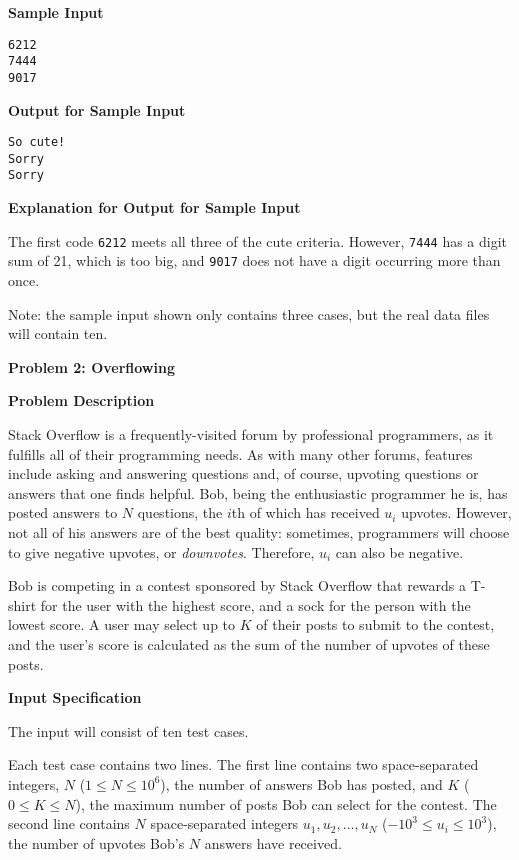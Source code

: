 \documentclass[11pt]{article}
\newcommand{\problem}[2]{\textbf{\Large Problem #1: #2} \vspace{0.4em}}
\newcommand{\heading}[1]{\vspace{0.6em} \textbf{#1}}
\begin{document}
\heading{Sample Input}
\vspace{-\topsep}
\begin{verbatim}
6212
7444
9017
\end{verbatim}

\heading{Output for Sample Input}
\vspace{-\topsep}
\begin{verbatim}
So cute!
Sorry
Sorry
\end{verbatim}

\heading{Explanation for Output for Sample Input}

The first code \verb|6212| meets all three of the cute criteria. However, \verb|7444| has a digit sum of 21, which is too big, and \verb|9017| does not have a digit occurring more than once.

Note: the sample input shown only contains three cases, but the real data files will contain ten.


\pagebreak




\problem{2}{Overflowing}


\heading{Problem Description}

Stack Overflow is a frequently-visited forum by professional programmers, as it fulfills all of their programming needs. As with many other forums, features include asking and answering questions and, of course, upvoting questions or answers that one finds helpful. Bob, being the enthusiastic programmer he is, has posted answers to $N$ questions, the $i$th of which has received $u_i$ upvotes. However, not all of his answers are of the best quality: sometimes, programmers will choose to give negative upvotes, or \textit{downvotes}. Therefore, $u_i$ can also be negative.

Bob is competing in a contest sponsored by Stack Overflow that rewards a T-shirt for the user with the highest score, and a sock for the person with the lowest score. A user may select up to $K$ of their posts to submit to the contest, and the user’s score is calculated as the sum of the number of upvotes of these posts.


\heading{Input Specification}

The input will consist of ten test cases.

Each test case contains two lines. The first line contains two space-separated integers, $N$ ($1 \le N \le 10^6$), the number of answers Bob has posted, and $K$ ($0 \le K \le N$), the maximum number of posts Bob can select for the contest. The second line contains $N$ space-separated integers $u_1, u_2, \ldots, u_N$ ($-10^3 \le u_i \le 10^3$), the number of upvotes Bob's $N$ answers have received.
\end{document}

